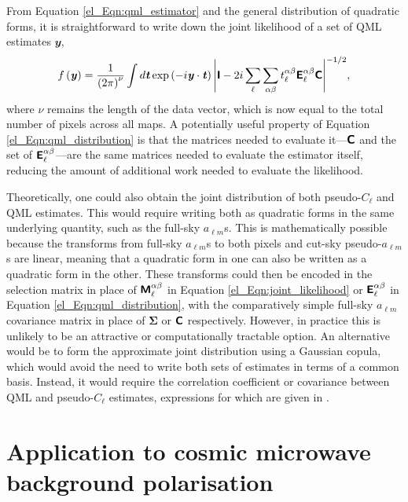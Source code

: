 From Equation \eqref{el_Eqn:qml_estimator} and the general distribution of quadratic forms, it is straightforward to write down the joint likelihood of a set of QML estimates $\mathbfit{y}$,
\begin{equation}
    f \left( \bm{\mathit{y}} \right) =
    \frac{1}{\left( 2 \pi \right)^\nu}
    \int d\bm{\mathit{t}}
    \exp \left( -i \bm{\mathit{y}} \cdot  \bm{\mathit{t}} \right)
    \Bigg\lvert \bm{\mathsf{I}} - 2i \sum_\ell \sum_{\alpha \beta}
    t_{\ell}^{\alpha \beta} \bm{\mathsf{E}}_\ell^{\alpha \beta}
    \bm{\mathsf{C}}
    \Bigg\rvert^{-1/2},
    \label{el_Eqn:qml_distribution}
\end{equation}
where $\nu$ remains the length of the data vector, which is now equal to the total number of pixels across all maps. A potentially useful property of Equation \eqref{el_Eqn:qml_distribution} is that the matrices needed to evaluate it---$\bm{\mathsf{C}}$ and the set of $\bm{\mathsf{E}}_\ell^{\alpha \beta}$---are the same matrices needed to evaluate the estimator itself, reducing the amount of additional work needed to evaluate the likelihood.

Theoretically, one could also obtain the joint distribution of both pseudo-$C_\ell$ and QML estimates. This would require writing both as quadratic forms in the same underlying quantity, such as the full-sky $a_{\ell m}$s. This is mathematically possible because the transforms from full-sky $a_{\ell m}$s to both pixels and cut-sky pseudo-$a_{\ell m}$s are linear, meaning that a quadratic form in one can also be written as a quadratic form in the other. These transforms could then be encoded in the selection matrix in place of $\bm{\mathsf{M}}_\ell^{\alpha \beta}$ in Equation \eqref{el_Eqn:joint_likelihood} or $\bm{\mathsf{E}}_\ell^{\alpha \beta}$ in Equation \eqref{el_Eqn:qml_distribution}, with the comparatively simple full-sky $a_{\ell m}$ covariance matrix in place of $\bm{\Sigma}$ or $\bm{\mathsf{C}}$ respectively. However, in practice this is unlikely to be an attractive or computationally tractable option. An alternative would be to form the approximate joint distribution using a Gaussian copula, which would avoid the need to write both sets of estimates in terms of a common basis. Instead, it would require the correlation coefficient or covariance between QML and pseudo-$C_\ell$ estimates, expressions for which are given in \citet{Efstathiou2004}.

\section{Application to cosmic microwave background polarisation}
\label{el_Sec:examples}

